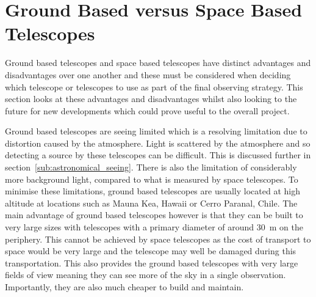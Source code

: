 \section{Ground Based versus Space Based Telescopes} %
\label{sec:ground_based_versus_space_based_telescopes}
	Ground based telescopes and space based telescopes have distinct advantages and disadvantages over one another and these must be considered when deciding which telescope or telescopes to use as part of the final observing strategy. This section looks at these advantages and disadvantages whilst also looking to the future for new developments which could prove useful to the overall project.

	Ground based telescopes are seeing limited which is a resolving limitation due to distortion caused by the atmosphere. Light is scattered by the atmosphere and so detecting a source by these telescopes can be difficult. This is discussed further in section~\ref{sub:astronomical_seeing}. There is also the limitation of considerably more background light, compared to what is measured by space telescopes. To minimise these limitations, ground based telescopes are usually located at high altitude at locations such as Mauna Kea, Hawaii or Cerro Paranal, Chile. The main advantage of ground based telescopes however is that they can be built to very large sizes with telescopes with a primary diameter of around \SI{30}{\metre} on the periphery. This cannot be achieved by space telescopes as the cost of transport to space would be very large and the telescope may well be damaged during this transportation. This also provides the ground based telescopes with very large fields of view meaning they can see more of the sky in a single observation. Importantly, they are also much cheaper to build and maintain.

